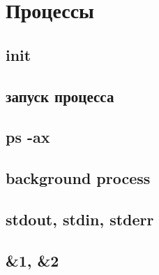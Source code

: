 \section{Процессы}
\subsection{init}
\subsection{запуск процесса}
\subsection{ps -ax}
\subsection{background process}
\subsection{stdout, stdin, stderr}
\subsection{\&1, \&2}
\newpage
